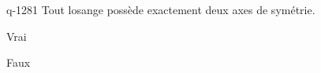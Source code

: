 \begin{truefalse}{q-1281}
Tout losange possède exactement deux axes de symétrie.
\item Vrai
\item* Faux
\end{truefalse}

